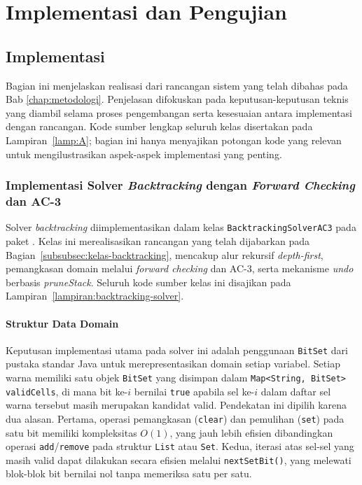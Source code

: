 \chapter{Implementasi dan Pengujian}
\label{chap:hasil}

\section{Implementasi}
\label{sec:implementasi}

Bagian ini menjelaskan realisasi dari rancangan sistem yang telah dibahas pada Bab \ref{chap:metodologi}. Penjelasan difokuskan pada keputusan-keputusan teknis yang diambil selama proses pengembangan serta kesesuaian antara implementasi dengan rancangan. Kode sumber lengkap seluruh kelas disertakan pada Lampiran~\ref{lamp:A}; bagian ini hanya menyajikan potongan kode yang relevan untuk mengilustrasikan aspek-aspek implementasi yang penting.

\subsection{Implementasi Solver \textit{Backtracking} dengan \textit{Forward Checking} dan AC-3}
\label{subsec:impl-backtracking}

Solver \textit{backtracking} diimplementasikan dalam kelas \texttt{BacktrackingSolverAC3} pada paket . Kelas ini merealisasikan rancangan yang telah dijabarkan pada Bagian~\ref{subsubsec:kelas-backtracking}, mencakup alur rekursif \textit{depth-first}, pemangkasan domain melalui \textit{forward checking} dan AC-3, serta mekanisme \textit{undo} berbasis \textit{pruneStack}. Seluruh kode sumber kelas ini disajikan pada Lampiran~\ref{lampiran:backtracking-solver}.

\subsubsection{Struktur Data Domain}

Keputusan implementasi utama pada solver ini adalah penggunaan \texttt{BitSet} dari pustaka standar Java untuk merepresentasikan domain setiap variabel. Setiap warna memiliki satu objek \texttt{BitSet} yang disimpan dalam \texttt{Map<String, BitSet> validCells}, di mana bit ke-$i$ bernilai \texttt{true} apabila sel ke-$i$ dalam daftar sel warna tersebut masih merupakan kandidat valid. Pendekatan ini dipilih karena dua alasan. Pertama, operasi pemangkasan (\texttt{clear}) dan pemulihan (\texttt{set}) pada satu bit memiliki kompleksitas $O(1)$, yang jauh lebih efisien dibandingkan operasi \texttt{add}/\texttt{remove} pada struktur \texttt{List} atau \texttt{Set}. Kedua, iterasi atas sel-sel yang masih valid dapat dilakukan secara efisien melalui \texttt{nextSetBit()}, yang melewati blok-blok bit bernilai nol tanpa memeriksa satu per satu.

